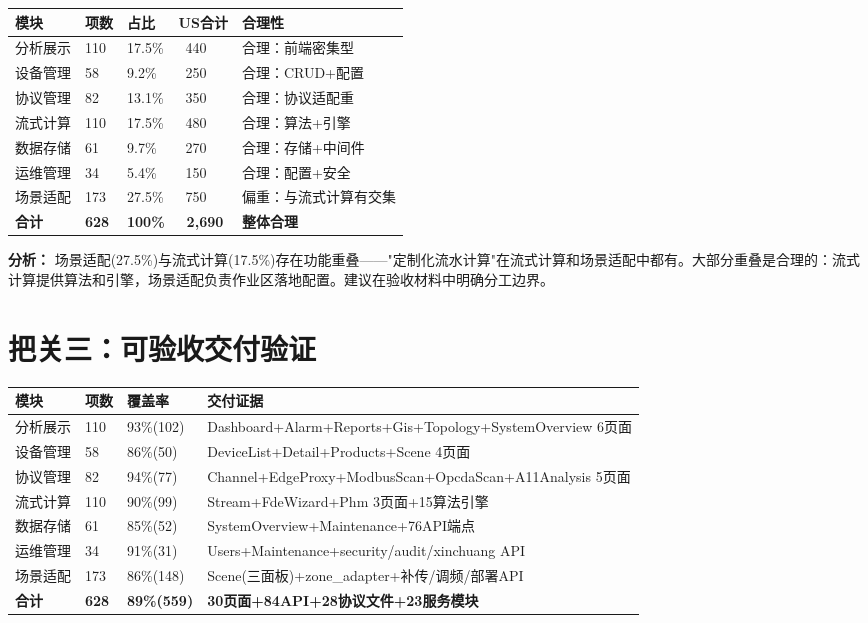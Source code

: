 \documentclass[11pt,a4paper]{ctexart}
\begin{document}
\begin{table}[H]\centering
\begin{tabular}{p{3.5cm}p{2cm}p{2.5cm}p{2.5cm}p{3cm}}
\toprule\textbf{模块} & \textbf{项数} & \textbf{占比} & \textbf{US合计} & \textbf{合理性} \\
\midrule
分析展示 & 110 & 17.5\% & ~440 & \color{ok}合理：前端密集型 \\
设备管理 & 58 & 9.2\% & ~250 & \color{ok}合理：CRUD+配置 \\
协议管理 & 82 & 13.1\% & ~350 & \color{ok}合理：协议适配重 \\
流式计算 & 110 & 17.5\% & ~480 & \color{ok}合理：算法+引擎 \\
数据存储 & 61 & 9.7\% & ~270 & \color{ok}合理：存储+中间件 \\
运维管理 & 34 & 5.4\% & ~150 & \color{ok}合理：配置+安全 \\
场景适配 & 173 & 27.5\% & ~750 & \color{warn}偏重：与流式计算有交集 \\
\midrule
\textbf{合计} & \textbf{628} & \textbf{100\%} & \textbf{~2,690} & \color{ok}\textbf{整体合理} \\
\bottomrule
\end{tabular}
\end{table}

\textbf{分析：} 场景适配(27.5\%)与流式计算(17.5\%)存在功能重叠——"定制化流水计算"在流式计算和场景适配中都有。大部分重叠是合理的：流式计算提供算法和引擎，场景适配负责作业区落地配置。建议在验收材料中明确分工边界。

\section{把关三：可验收交付验证}

\begin{table}[H]\centering
\begin{tabular}{p{3.5cm}p{2cm}p{2cm}p{5cm}}
\toprule\textbf{模块} & \textbf{项数} & \textbf{覆盖率} & \textbf{交付证据} \\
\midrule
分析展示 & 110 & 93\%(102) & Dashboard+Alarm+Reports+Gis+Topology+SystemOverview 6页面 \\
设备管理 & 58 & 86\%(50) & DeviceList+Detail+Products+Scene 4页面 \\
协议管理 & 82 & 94\%(77) & Channel+EdgeProxy+ModbusScan+OpcdaScan+A11Analysis 5页面 \\
流式计算 & 110 & 90\%(99) & Stream+FdeWizard+Phm 3页面+15算法引擎 \\
数据存储 & 61 & 85\%(52) & SystemOverview+Maintenance+76API端点 \\
运维管理 & 34 & 91\%(31) & Users+Maintenance+security/audit/xinchuang API \\
场景适配 & 173 & 86\%(148) & Scene(三面板)+zone\_adapter+补传/调频/部署API \\
\midrule
\textbf{合计} & \textbf{628} & \textbf{89\%(559)} & \textbf{30页面+84API+28协议文件+23服务模块} \\
\bottomrule
\end{tabular}
\end{table}
\end{document}
